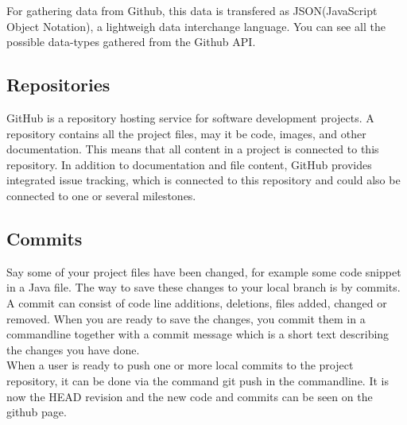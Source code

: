 For gathering data from Github, this data is transfered as JSON(JavaScript Object Notation), a lightweigh data interchange language. You can see all the possible data-types gathered from the Github API.
\subsection{Repositories}
GitHub is a repository hosting service for software development projects. A repository contains all the project files, may it be code, images, and other documentation. This means that all content in a project is connected to this repository. In addition to documentation and file content, GitHub provides integrated issue tracking, which is connected to this repository and could also be connected to one or several milestones. 
\subsection{Commits}
Say some of your project files have been changed, for example some code snippet in a Java file. The way to save these changes to your local branch is by commits. A commit can consist of code line additions, deletions, files added, changed or removed. When you are ready to save the changes, you commit them in a commandline together with a commit message which is a short text describing the changes you have done. \\
When a user is ready to push one or more local commits to the project repository, it can be done via the command git push in the commandline. It is now the HEAD revision and the new code and commits can be seen on the github page.

